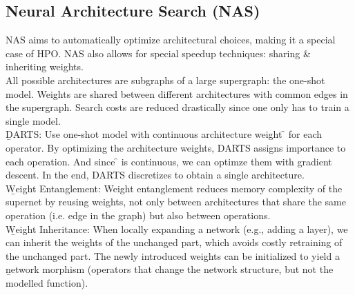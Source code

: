 \subsection{Neural Architecture Search (NAS)}
NAS aims to automatically optimize architectural choices, making it a special case of HPO. NAS also allows for special speedup techniques: sharing \& inheriting weights.\\
All possible architectures are subgraphs of a large supergraph: the one-shot model. Weights are shared between different architectures with common edges in the supergraph. Search costs are reduced drastically since one only has to train a single model.\\

\b{DARTS:} Use one-shot model with continuous architecture weight \f{\alpha} for each operator. By optimizing the architecture weights, DARTS assigns importance to each operation. And since \f{\alpha} is continuous, we can optimze them with gradient descent. In the end, DARTS discretizes to obtain a single architecture.\\

\b{Weight Entanglement:} Weight entanglement reduces memory complexity of the supernet by reusing weights, not only between architectures that share the same operation (i.e. edge in the graph) but also between operations.\\

\b{Weight Inheritance:} When locally expanding a network (e.g., adding a layer), we can inherit the weights of the unchanged part, which avoids costly retraining of the unchanged part. The newly introduced weights can be initialized to yield a \b{network morphism} (operators that change the network structure, but not the modelled function).